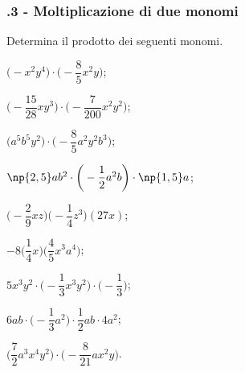 \subsubsection*{\thechapter.3 - Moltiplicazione di due monomi}

\begin{esercizio}[\Ast]
 \label{ese:10.12} %
Determina il prodotto dei seguenti monomi.
\begin{multicols}{2}
\begin{enumeratea}
\spazielenx
 \item $\big(-x^{2}y^{4}\big)\cdot \bigg(-{\dfrac{8}{5}}x^{2}y\bigg)$;
 \item $\bigg(-{\dfrac{15}{28}}xy^{3}\bigg)\cdot\bigg(-\dfrac{7}{200}x^{2}y^{2}\bigg)$;
 \item $\big(a^{5}b^{5}y^{2}\big)\cdot\bigg(-\dfrac{8}{5}a^{2}y^{2}b^{3}\bigg)$;
 \item $\np{2,5}ab^{2}\cdot \bigg(-{\dfrac{1}{2}}a^{2}b\bigg)\cdot \np{1,5}a$;
 \item $\bigg(-{\dfrac{2}{9}}xz\bigg)\bigg(-{\dfrac{1}{4}}z^{3}\bigg)(27x)$;
 \item $-8\bigg(\dfrac{1}{4}x\bigg)\bigg(\dfrac{4}{5}x^{3}a^{4}\bigg)$;
 \item $5x^{3}y^{2}\cdot \bigg(-{\dfrac{1}{3}}x^{3}y^{2}\bigg)\cdot \bigg(-{\dfrac{1}{3}}\bigg)$;
 \item $6ab\cdot \bigg(-{\dfrac{1}{3}}a^{2}\bigg)\cdot {\dfrac{1}{2}ab\cdot 4a^{2}}$;
 \item $\bigg(\dfrac{7}{2}a^{3}x^{{4}}y^{2}\bigg)\cdot \bigg(-{\dfrac{8}{21}}ax^{2}y\bigg)$.
\end{enumeratea}
\end{multicols}
\end{esercizio}

